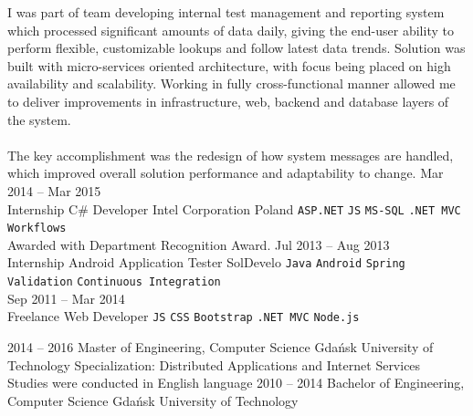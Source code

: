 \documentclass[9pt]{style/developercv}
\begin{document}
\begin{entrylist}
{            I was part of team developing internal test management and reporting 
            system which processed significant amounts of data daily, giving 
            the end-user ability to perform flexible, customizable lookups
            and follow latest data trends.
            Solution was built with micro-services oriented architecture, with 
            focus being placed on high availability and scalability.
            Working in fully cross-functional manner allowed me to deliver 
            improvements in infrastructure, web, backend and database layers 
            of the system.\\ \\
            The key accomplishment was the redesign of how system messages are 
            handled, which improved overall solution performance and adaptability to
            change.
        }
    \entry
        {Mar 2014 -- Mar 2015\\\footnotesize{Internship}}
        {C\# Developer}
        {Intel Corporation Poland}
        {
            \texttt{ASP.NET}\slashsep
            \texttt{JS}\slashsep
            \texttt{MS-SQL}\slashsep
            \texttt{.NET MVC}\slashsep
            \texttt{Workflows}\\
            Awarded with Department Recognition Award.
        }
    \entry
        {Jul 2013 -- Aug 2013\\\footnotesize{Internship}}
        {Android Application Tester}
        {SolDevelo}
        {
            \texttt{Java}\slashsep
            \texttt{Android}\slashsep
            \texttt{Spring}\slashsep
            \texttt{Validation}\slashsep
            \texttt{Continuous Integration}\\
        }
    \entry
        {Sep 2011 -- Mar 2014\\\footnotesize{Freelance}}
        {Web Developer}
        {}
        {
            \texttt{JS}\slashsep
            \texttt{CSS}\slashsep
            \texttt{Bootstrap}\slashsep
            \texttt{.NET MVC}\slashsep
            \texttt{Node.js}\\
        }
\end{entrylist}



\begin{entrylist}
    \entry
        {2014 -- 2016}
        {Master of Engineering, Computer Science}
        {Gdańsk University of Technology}
        {
            Specialization: Distributed Applications and Internet Services \\
            Studies were conducted in English language
        }
    \entry
        {2010 -- 2014}
        {Bachelor of Engineering, Computer Science}
        {Gdańsk University of Technology}
        {}
\end{entrylist}
\end{document}
